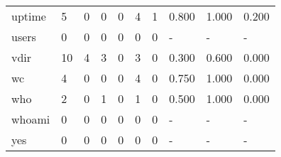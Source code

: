 \begin{longtable}{lp{2.0cm}p{2.0cm}p{2.0cm}p{2.0cm}p{2.0cm}p{2.0cm}p{2.0cm}p{2.0cm}p{2.0cm}}
uptime    &                      5 &                                  0 &                                 0 &                                0 &                                 4 &                               1 &                                0.800 &                                  1.000 &                                0.200 \\
users     &                      0 &                                  0 &                                 0 &                                0 &                                 0 &                               0 &                                    - &                                      - &                                    - \\
vdir      &                     10 &                                  4 &                                 3 &                                0 &                                 3 &                               0 &                                0.300 &                                  0.600 &                                0.000 \\
wc        &                      4 &                                  0 &                                 0 &                                0 &                                 4 &                               0 &                                0.750 &                                  1.000 &                                0.000 \\
who       &                      2 &                                  0 &                                 1 &                                0 &                                 1 &                               0 &                                0.500 &                                  1.000 &                                0.000 \\
whoami    &                      0 &                                  0 &                                 0 &                                0 &                                 0 &                               0 &                                    - &                                      - &                                    - \\
yes       &                      0 &                                  0 &                                 0 &                                0 &                                 0 &                               0 &                                    - &                                      - &                                    - \\
\end{longtable}

